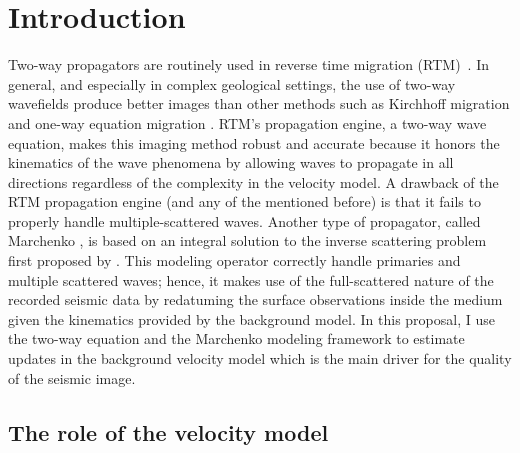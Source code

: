 \section{Introduction}

Two-way propagators are routinely used in reverse time migration
(RTM)~\citep{baysal:1514, whitmore:382, GPR:GPR413}. In general,
and especially in complex geological settings, the use of two-way
wavefields produce better images than other methods such as Kirchhoff
migration \citep{Schneider,Blestein87} and one-way equation migration
\citep{gazdag:1342,gazdag:124}. RTM's propagation engine, a two-way
wave equation, makes this imaging method robust and accurate
because it honors the kinematics of the wave phenomena by allowing
waves to propagate in all directions regardless of the complexity
in the velocity model. A drawback of the RTM propagation engine
(and any of the mentioned before) is that it fails to properly
handle multiple-scattered waves. Another type of propagator, called
Marchenko \citep{Fil2012,Behura,Wapenaar,Singh2015}, is based on an
integral solution to the inverse scattering problem first proposed
by \cite{rose2002,rose2002single}. This modeling operator correctly
handle primaries and multiple scattered waves; hence, it makes use of
the full-scattered nature of the recorded seismic data by redatuming
the surface observations inside the medium given the kinematics
provided by the background model. In this proposal, I use the two-way
equation and the Marchenko modeling framework to estimate updates
in the background velocity model which is the main driver for the
quality of the seismic image. %

\subsection{The role of the velocity model}

